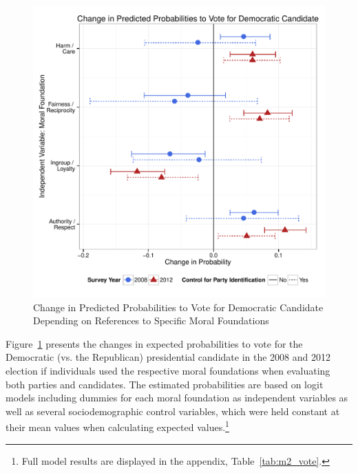\documentclass[12pt]{article}
\begin{document}
\begin{figure}[ht]\centering
\includegraphics[scale=.6]{../calc/fig/m2_vote.pdf}
\caption{Change in Predicted Probabilities to Vote for Democratic Candidate Depending on References to Specific Moral Foundations}\label{fig:m2_vote}
\end{figure}

Figure~\ref{fig:m2_vote} presents the changes in expected probabilities to vote for the Democratic (vs. the Republican) presidential candidate in the 2008 and 2012 election if individuals used the respective moral foundations when evaluating both parties and candidates. The estimated probabilities are based on logit models including dummies for each moral foundation as independent variables as well as several sociodemographic control variables, which were held constant at their mean values when calculating expected values.\footnote{Full model results are displayed in the appendix, Table~\ref{tab:m2_vote}.}
\end{document}
